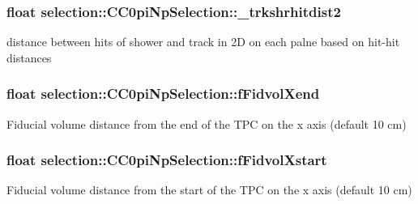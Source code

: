 \subsubsection[{\texorpdfstring{\+\_\+trkshrhitdist2}{_trkshrhitdist2}}]{\setlength{\rightskip}{0pt plus 5cm}float selection\+::\+C\+C0pi\+Np\+Selection\+::\+\_\+trkshrhitdist2\hspace{0.3cm}{\ttfamily [private]}}\hypertarget{classselection_1_1CC0piNpSelection_a75ceddff5c910a6da69588a04d931931}{}\label{classselection_1_1CC0piNpSelection_a75ceddff5c910a6da69588a04d931931}
distance between hits of shower and track in 2D on each palne based on hit-\/hit distances 
\subsubsection[{\texorpdfstring{f\+Fidvol\+Xend}{fFidvolXend}}]{\setlength{\rightskip}{0pt plus 5cm}float selection\+::\+C\+C0pi\+Np\+Selection\+::f\+Fidvol\+Xend\hspace{0.3cm}{\ttfamily [private]}}\hypertarget{classselection_1_1CC0piNpSelection_a754589459e1f2d90a8ad853c68f864db}{}\label{classselection_1_1CC0piNpSelection_a754589459e1f2d90a8ad853c68f864db}
Fiducial volume distance from the end of the T\+PC on the x axis (default 10 cm) 
\subsubsection[{\texorpdfstring{f\+Fidvol\+Xstart}{fFidvolXstart}}]{\setlength{\rightskip}{0pt plus 5cm}float selection\+::\+C\+C0pi\+Np\+Selection\+::f\+Fidvol\+Xstart\hspace{0.3cm}{\ttfamily [private]}}\hypertarget{classselection_1_1CC0piNpSelection_a783e7f9dcd42c083658870f7d23931da}{}\label{classselection_1_1CC0piNpSelection_a783e7f9dcd42c083658870f7d23931da}
Fiducial volume distance from the start of the T\+PC on the x axis (default 10 cm) 
